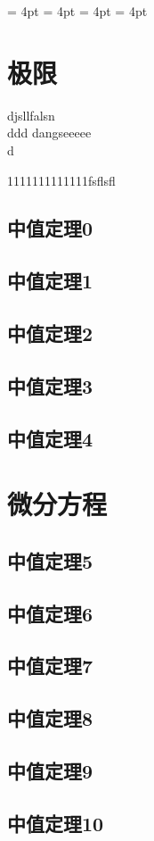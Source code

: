 \documentclass[no-math]{lecture}
\begin{document}
	\raggedbottom
	\abovedisplayshortskip = 4pt
	\belowdisplayshortskip = 4pt
	\abovedisplayskip 		 = 4pt
	\belowdisplayskip 		 = 4pt
	\frontmatter
		\tableofcontents
	\mainmatter
\newpage
	\chapter{极限}


	\begin{tcolorbox}[assess]
		djsllfalsn\\
		ddd dangseeeee\\
		d
	\end{tcolorbox}
	1111111111111fsflsfl
			{\begin{tcolorbox}[analysis]

			\end{tcolorbox}}
	\newpage
	
	\newpage

	\section{中值定理0}
	\section{中值定理1}
	\section{中值定理2}
	\section{中值定理3}
	\section{中值定理4}
\newpage
	\chapter{微分方程}
	\section{中值定理5}
	\section{中值定理6}
	\section{中值定理7}
	\section{中值定理8}
	\section{中值定理9}
	\section{中值定理10}
\end{document}
